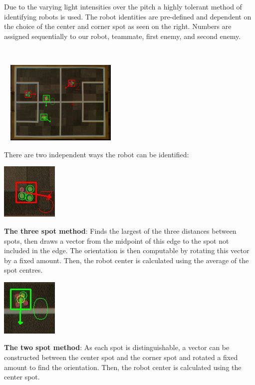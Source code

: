 \documentclass[a4paper,12pt]{article}
\begin{document}
\begin{minipage}{0.62\textwidth}
Due to the varying light intensities over the pitch a highly tolerant method of identifying robots is used. The robot identities are pre-defined and dependent on the choice of the center and corner spot as seen on the right. Numbers are assigned sequentially to our robot, teammate, first enemy, and second enemy.
\end{minipage}
~
\begin{minipage}{0.3\textwidth}
\includegraphics[height=40mm,width=60mm]{ex1.jpg}
\end{minipage}

There are two independent ways the robot can be identified:

\begin{minipage}{0.2\textwidth}
\includegraphics[scale=0.7]{3spot.jpg}
\end{minipage}
\begin{minipage}{0.8\textwidth}   
\textbf{The three spot method}: Finds the largest of the three distances between spots, then draws a vector from the midpoint of this edge to the spot not included in the edge. The orientation is then computable by rotating this vector by a fixed amount. Then, the robot center is calculated using the average of the spot centres.
\end{minipage}

\begin{minipage}{0.2\textwidth}
\includegraphics[scale=0.7]{2spot.jpg}
\end{minipage}
\begin{minipage}{0.8\textwidth}
\textbf{The two spot method}: As each spot is distinguishable, a vector can be constructed between the center spot and the corner spot and rotated a fixed amount to find the orientation. Then, the robot center is calculated using the center spot. 
\end{minipage}
\end{document}

